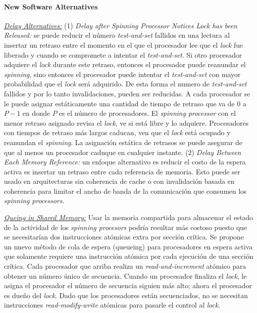 \paragraph{\textnormal{\textbf{New Software Alternatives}}}
\underline{\textit{Delay Alternatives:}} (1) \textit{Delay after Spinning Processor Notices Lock has been Released:} se puede reducir el número \textit{test-and-set} fallidos en una lectura al insertar un retraso entre el momento en el que el procesador lee que el \textit{lock} fue liberado y cuando se compromete a intentar el \textit{test-and-set}. Si otro procesador adquiere el \textit{lock} durante este retraso, entonces el procesador puede reanundar el \textit{spinning}, sino entonces el procesador puede intentar el \textit{test-and-set} con mayor probabilidad que el \textit{lock} será adquirido. De esta forma el numero de \textit{test-and-set} fallidos y por lo tanto invalidaciones, pueden ser reducidas. A cada procesador se le puede asignar estáticamente una cantidad de tiempo de retraso que va de $0$ a $P - 1$ en donde $P$ es el número de procesadores. El \textit{spinning processor} con el menor retraso asignado revisa el \textit{lock}, ve si está libre y lo adquiere. Procesadores con tiempos de retraso más largos   caducan, ven que el \textit{lock} está ocupado y reanundan el \textit{spinning}. La asignación estática de retrasos se puede asegurar de que al menos un procesador caduque en cualquier instante. (2) \textit{Delay Between Each Memory Reference:} un enfoque alternativo es reducir el costo de la espera activa es insertar un retraso entre cada referencia de memoria. Esto puede ser usado en arquitecturas sin coherencia de cache o con invalidación basada en coherencia para limitar el ancho de banda de la comunicación que consumen los \textit{spinning processors}. 

\underline{\textit{Queing in Shared Memory:}} Usar la memoria compartida para almacenar el estado de la actividad de los \textit{spinning procesors} podría resultar más costoso puesto que se necesitarían dos instrucciones atómicas extra por sección crítica. Se propone un nuevo método de cola de espera (queueing) para procesadores en espera activa que solamente requiere una instrucción atómica por cada ejecución de una sección crítica. Cada procesador que arriba realiza un \textit{read-and-increment} atómico para obtener un número único de secuencia. Cuando un procesador finaliza el \textit{lock}, le asigna el procesador el número de secuencia siguien más alto; ahora el procesador es dueño del \textit{lock}. Dado que los procesadores están secuenciados, no se necesitan instrucciones \textit{read-modify-write} atómicas para pasarle el control al \textit{lock}.

